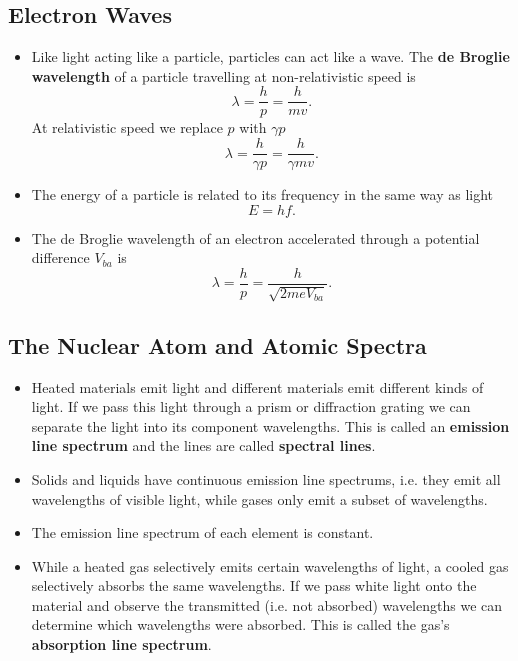 \documentclass{article}
\begin{document}
\subsection{Electron Waves}

\begin{itemize}
  \item Like light acting like a particle, particles can act like a wave. The \textbf{de Broglie wavelength} of a particle travelling at non-relativistic speed is \[\lambda = \frac{h}{p} = \frac{h}{mv}.\] At relativistic speed we replace $p$ with $\gamma p$ \[\lambda = \frac{h}{\gamma p} = \frac{h}{\gamma m v}.\]

  \item The energy of a particle is related to its frequency in the same way as light \[E = h f.\]

  \item The de Broglie wavelength of an electron accelerated through a potential difference $V_{b a}$ is \[\lambda = \frac{h}{p} = \frac{h}{\sqrt{2 m e V_{b a}}}.\]
\end{itemize}

\subsection{The Nuclear Atom and Atomic Spectra}

\begin{itemize}
  \item Heated materials emit light and different materials emit different kinds of light. If we pass this light through a prism or diffraction grating we can separate the light into its component wavelengths. This is called an \textbf{emission line spectrum} and the lines are called \textbf{spectral lines}.

  \item Solids and liquids have continuous emission line spectrums, i.e. they emit all wavelengths of visible light, while gases only emit a subset of wavelengths.

  \item The emission line spectrum of each element is constant.

  \item While a heated gas selectively emits certain wavelengths of light, a cooled gas selectively absorbs the same wavelengths. If we pass white light onto the material and observe the transmitted (i.e. not absorbed) wavelengths we can determine which wavelengths were absorbed. This is called the gas's \textbf{absorption line spectrum}.
\end{itemize}
\end{document}
